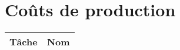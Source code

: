 \documentclass[../doc.tex]{subfiles}
\begin{document}
\section{Coûts de production}

\begin{center}
    \begin{tabular}{|c||c|}
        \hline
        \textbf{Tâche} & \textbf{Nom} \tabularnewline
        \hline
        
    \end{tabular}
\end{center}
\end{document}
